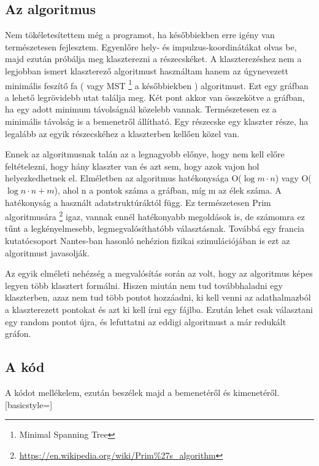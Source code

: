 \documentclass[a4paper,12pt]{article}
\begin{document}
\subsection{ Az algoritmus}
\par Nem tökéletesítettem még a programot, ha későbbiekben erre igény van természetesen fejlesztem. Egyenlőre hely- és impulzus-koordinátákat
olvas be, majd ezután próbálja meg klaszterezni a részecskéket. A klaszterezéshez nem a legjobban ismert klaszterező algoritmust
használtam hanem az úgynevezett minimális feszítő fa ( vagy MST \footnote{Minimal Spanning Tree} a későbbiekben ) algoritmust. Ezt egy 
gráfban a lehető legrövidebb utat találja meg. Két pont akkor van összekötve a gráfban, ha egy adott minimum távolságnál közelebb vannak.
Természetesen ez a minimális távolság is a bemenetről állítható. Egy részecske egy klaszter része, ha legalább az egyik részecskéhez a
klaszterben kellően közel van. 
\par Ennek az algoritmusnak talán az a legnagyobb előnye, hogy nem kell előre feltételezni, hogy hány klaszter van és azt sem, hogy 
azok vajon hol helyezkedhetnek el. Elméletben az algoritmus hatékonysága O($\log{m}\cdot n$) vagy O($\log{n}\cdot n + m$), ahol n a pontok
száma a gráfban, míg m az élek száma. A hatékonyság a használt adatstruktúráktól függ. Ez természetesen Prim algoritmusára \footnote{\url{https://en.wikipedia.org/wiki/Prim\%27s_algorithm}}
igaz, vannak ennél hatékonyabb megoldások is, de számomra ez tűnt a legkényelmesebb, legmegvalósíthatóbb választásnak. Továbbá egy francia 
kutatócsoport Nantes-ban hasonló nehézion fizikai szimulációjában is ezt az algoritmust javasolják.
\par  Az egyik elméleti nehézség a megvalósítás során az volt, hogy az algoritmus képes legyen több klasztert formálni. Hiszen miután 
nem tud továbbhaladni egy klaszterben, azaz nem tud több pontot hozzáadni, ki kell venni az adathalmazból a klaszterezett pontokat és 
azt ki kell írni egy fájlba. Ezután lehet csak választani egy random pontot újra, és lefuttatni az eddigi algoritmust a már redukált gráfon.
\subsection{ A kód}
\par A kódot mellékelem, ezután beszélek majd a bemenetéről és kimenetéről.
[basicstyle=\linespread{1.12358}]
\end{document}
